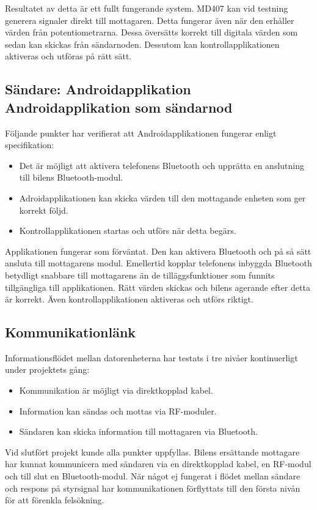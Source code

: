 \documentclass[a4paper]{article}
\begin{document}
\noindent
Resultatet av detta är ett fullt fungerande system. MD407 kan vid testning generera signaler direkt till mottagaren. Detta fungerar även när den erhåller värden från potentiometrarna. Dessa översätts korrekt till digitala värden som sedan kan skickas från sändarnoden. Dessutom kan kontrollapplikationen aktiveras och utföras på rätt sätt.


\subsection{Sändare: Androidapplikation \\ Androidapplikation som sändarnod}
Följande punkter har verifierat att Androidapplikationen fungerar enligt specifikation:

\begin{itemize}
\item Det är möjligt att aktivera telefonens Bluetooth och upprätta en anslutning till bilens Bluetooth-modul.
\item Adroidapplikationen kan skicka värden till den mottagande enheten som ger korrekt följd.
\item Kontrollapplikationen startas och utförs när detta begärs.
\end{itemize}

\noindent
Applikationen fungerar som förväntat. Den kan aktivera Bluetooth och på så sätt ansluta till mottagarens modul. Emellertid kopplar telefonens inbyggda Bluetooth betydligt snabbare till mottagarens än de tilläggsfunktioner som funnits tillgängliga till applikationen. Rätt värden skickas och bilens agerande efter detta är korrekt. Även kontrollapplikationen aktiveras och utförs riktigt.

\subsection{Kommunikationlänk}
Informationsflödet mellan datorenheterna har testats i tre nivåer kontinuerligt under projektets gång:
\begin{itemize}
\item Kommunikation är möjligt via direktkopplad kabel.
\item Information kan sändas och mottas via RF-moduler.
\item Sändaren kan skicka information till mottagaren via Bluetooth.
\end{itemize}

\noindent
Vid slutfört projekt kunde alla punkter uppfyllas. Bilens ersättande mottagare har kunnat kommunicera med sändaren via en direktkopplad kabel, en RF-modul och till slut en Bluetooth-modul. När något ej fungerat i flödet mellan sändare och respons på styrsignal har kommunikationen förflyttats till den första nivån för att förenkla felsökning.
\end{document}
